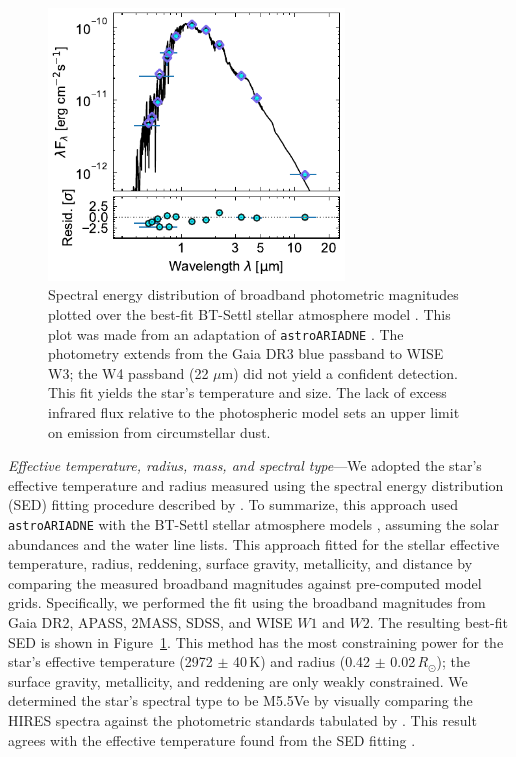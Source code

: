 \documentclass{nature3}
\begin{document}
\begin{methods}
\begin{figure}[!t]
  \centering
  \includegraphics[width=0.7\textwidth]{figures/sf4.pdf}
  \caption{
    Spectral energy distribution of broadband photometric magnitudes
    plotted over the best-fit BT-Settl stellar atmosphere model
    \cite{Allard2012}.  This plot was made from an adaptation of \texttt{astroARIADNE}
    \cite{Vines2022}.  The photometry extends from the Gaia DR3 blue
    passband to WISE W3;  the W4 passband (22 $\mu$m) did not yield
    a confident detection.  This fit yields the star's temperature and
    size.  The lack of excess infrared flux relative to the photospheric
    model sets an upper limit on emission from circumstellar dust.
    }
  \label{fig:sed}
\end{figure}

{\it Effective temperature, radius, mass, and spectral type}---We adopted
the star's effective temperature and radius measured using the spectral
energy distribution (SED) fitting procedure described by
\cite{Bouma2024}.  To summarize, this approach used
\texttt{astroARIADNE} \cite{Vines2022} with the BT-Settl stellar
atmosphere models \cite{Allard2012}, assuming the \cite{Asplund2009}
solar abundances and the \cite{Barber2006} water line lists.  This
approach fitted for the stellar effective temperature, radius,
reddening, surface gravity, metallicity, and distance by comparing the
measured broadband magnitudes against pre-computed model grids.
Specifically, we performed the fit using the broadband magnitudes from
Gaia DR2, APASS, 2MASS, SDSS, and WISE $W1$ and $W2$.  The resulting
best-fit SED is shown in Figure~\ref{fig:sed}.  This method has the most
constraining power for the star's effective temperature (2972 $\pm$
40\,K) and radius (0.42 $\pm$ 0.02\,$R_\odot$); the surface gravity,
metallicity, and reddening are only weakly constrained.  We
determined the star's spectral type to be M5.5Ve by visually comparing
the HIRES spectra against the photometric standards tabulated by
\cite{Bochanski2007}.   This result agrees with the effective
temperature found from the SED fitting \cite{Pecaut2013}.


\end{methods}
\end{document}

